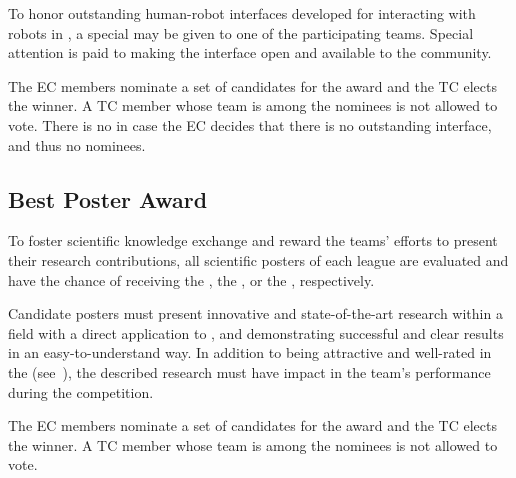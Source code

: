 To honor outstanding human-robot interfaces developed for interacting with robots in \AtHome{}, a special \HRIAward{} may be given to one of the participating teams.
Special attention is paid to making the interface open and available to the \AtHome{} community.

The \AtHome{} EC members nominate a set of candidates for the award and the TC elects the winner.
A TC member whose team is among the nominees is not allowed to vote.
There is no \HRIAward{} in case the EC decides that there is no outstanding interface, and thus no nominees.

\subsection{Best Poster Award}
\label{award:poster}

To foster scientific knowledge exchange and reward the teams' efforts to present their research contributions, all scientific posters of each league are evaluated and have the chance of receiving the \DSPLPosterAward, the \OPLPosterAward, or the \SSPLPosterAward, respectively.

Candidate posters must present innovative and state-of-the-art research within a field with a direct application to \AtHome, and demonstrating successful and clear results in an easy-to-understand way.
In addition to being attractive and well-rated in the \PS{} (see~), the described research must have impact in the team's performance during the competition.

The \AtHome{} EC members nominate a set of candidates for the award and the TC elects the winner.
A TC member whose team is among the nominees is not allowed to vote.

%
%
%

